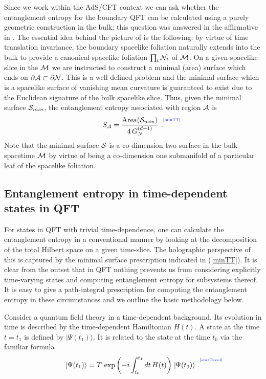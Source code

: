 \documentclass[12pt]{article}
\def\req#1{(\ref{#1})}
\def\p{\partial}
\def\CA{{\cal A}}
\def\CS{{\cal S}}
\def\p{\partial}
\def\p{\partial}
\def\ket#1{\mid  \! \! #1   \rangle}
\def\Label#1{\label{#1}%
{ \color{blue}{\smash{\hbox to0pt{\raise2ex\hbox{\tiny[#1]}\hss}}}}}
\def\bulk{{\cal M}}
\def\bdys{\p{\cal N}}
\def\ms{\CS}
\def\rA{\CA}
\def\brA{\p \CA}
\def\area#1{{\rm Area}(#1)}
\begin{document}
Since we work within the AdS/CFT context we can ask whether the entanglement entropy
 for the boundary QFT can be calculated using a purely geometric construction in
 the bulk; this question was answered in the affirmative in
 \cite{Ryu:2006bv, Ryu:2006ef}. The essential
  idea behind the picture of \cite{Ryu:2006bv, Ryu:2006ef}
  is the following: by virtue of time
   translation invariance, the boundary spacelike foliation naturally extends into the bulk
    to provide a canonical spacelike foliation $\prod_{t}{\cal N}_t$ of $\bulk$.
    On a given spacelike
     slice in the $\bulk$ we are instructed to construct a minimal (area) surface which
      ends on $\brA \subset \bdys$. This is a well defined problem and the minimal surface
       which is a spacelike surface of vanishing mean curvature is guaranteed to exist
        due to the Euclidean signature of the bulk spacelike slice. Thus, given the minimal
         surface $\ms_{min}$, the entanglement entropy associated with region $\rA$ is
%
\begin{equation}
S_\rA = {\area{\ms_{min}}  \over 4 \, G_N^{(d+1)} } \ .
\Label{minTT}
\end{equation}
%
Note that the minimal surface $\ms$ is a co-dimension two surface in the bulk spacetime
 $\bulk$ by virtue of being a co-dimension one submanifold of a particular leaf of the
  spacelike foliation.

\subsection{Entanglement entropy in time-dependent states in QFT}
\label{tdqft}

For states in QFT with trivial time-dependence, one can calculate the entanglement entropy in a conventional manner by looking at the decomposition of the total Hilbert space on a given time-slice. The holographic perspective of this is captured by the minimal surface prescription indicated in \req{minTT}. It is clear from the outset that in QFT nothing prevents us from considering explicitly time-varying states and computing entanglement entropy for subsystems thereof. It is easy to give a path-integral prescription for computing the entanglement entropy in these circumstances and we outline the basic methodology below.


Consider a quantum field theory in a time-dependent background. Its
evolution in time is described by the time-dependent Hamiltonian
$H(t)$. A state at the time $t=t_1$ is defined by $\ket{\Psi(t_1)}$.
It is
 related to the state at the time $t_0$ via the familiar formula
 \begin{equation}
\ket{\Psi(t_1)}=T\, \exp\left(-i\int^{t_1}_{t_0} dt \,
H(t)\right)\ket{\Psi(t_0)} \ .
\Label{statTevol}
\end{equation}
%
\end{document}
